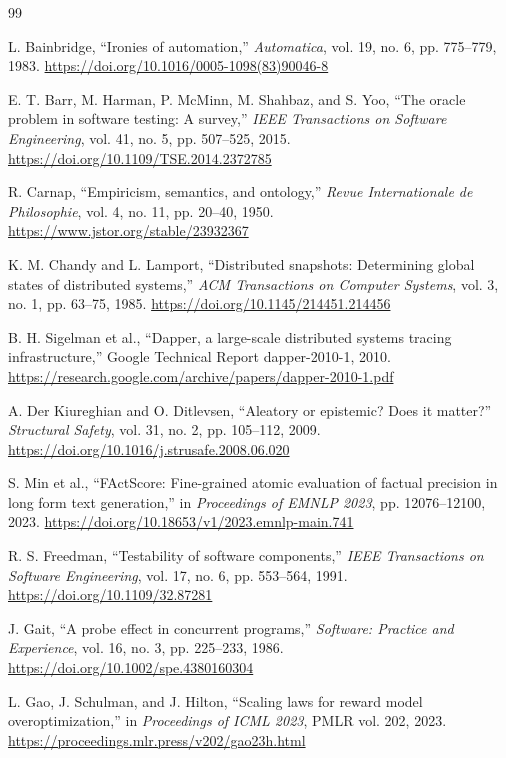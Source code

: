\documentclass[10pt,a4paper]{article}
\begin{document}
\small
\begin{thebibliography}{99}

L. Bainbridge, ``Ironies of automation,'' \emph{Automatica}, vol. 19, no. 6, pp. 775--779, 1983. \url{https://doi.org/10.1016/0005-1098(83)90046-8}

E. T. Barr, M. Harman, P. McMinn, M. Shahbaz, and S. Yoo, ``The oracle problem in software testing: A survey,'' \emph{IEEE Transactions on Software Engineering}, vol. 41, no. 5, pp. 507--525, 2015. \url{https://doi.org/10.1109/TSE.2014.2372785}

R. Carnap, ``Empiricism, semantics, and ontology,'' \emph{Revue Internationale de Philosophie}, vol. 4, no. 11, pp. 20--40, 1950. \url{https://www.jstor.org/stable/23932367}

K. M. Chandy and L. Lamport, ``Distributed snapshots: Determining global states of distributed systems,'' \emph{ACM Transactions on Computer Systems}, vol. 3, no. 1, pp. 63--75, 1985. \url{https://doi.org/10.1145/214451.214456}

B. H. Sigelman et al., ``Dapper, a large-scale distributed systems tracing infrastructure,'' Google Technical Report dapper-2010-1, 2010. \url{https://research.google.com/archive/papers/dapper-2010-1.pdf}

A. Der Kiureghian and O. Ditlevsen, ``Aleatory or epistemic? Does it matter?'' \emph{Structural Safety}, vol. 31, no. 2, pp. 105--112, 2009. \url{https://doi.org/10.1016/j.strusafe.2008.06.020}

S. Min et al., ``FActScore: Fine-grained atomic evaluation of factual precision in long form text generation,'' in \emph{Proceedings of EMNLP 2023}, pp. 12076--12100, 2023. \url{https://doi.org/10.18653/v1/2023.emnlp-main.741}

R. S. Freedman, ``Testability of software components,'' \emph{IEEE Transactions on Software Engineering}, vol. 17, no. 6, pp. 553--564, 1991. \url{https://doi.org/10.1109/32.87281}

J. Gait, ``A probe effect in concurrent programs,'' \emph{Software: Practice and Experience}, vol. 16, no. 3, pp. 225--233, 1986. \url{https://doi.org/10.1002/spe.4380160304}

L. Gao, J. Schulman, and J. Hilton, ``Scaling laws for reward model overoptimization,'' in \emph{Proceedings of ICML 2023}, PMLR vol. 202, 2023. \url{https://proceedings.mlr.press/v202/gao23h.html}


\end{thebibliography}
\end{document}
